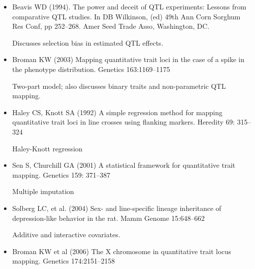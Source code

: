 \documentclass[12pt]{article}
\begin{document}
\hspace*{0.5in}
\begin{minipage}{9.5in}
\begin{itemize}
\itemsep8pt
\item Beavis WD (1994). The power and deceit of QTL experiments:
  Lessons from comparative QTL studies. In DB Wilkinson,
  (ed) 49th Ann Corn Sorghum Res Conf, pp
  252--268. Amer Seed Trade Asso, Washington, DC.

{\color{myblue} Discusses selection bias in estimated QTL effects.}

\item Broman KW (2003) Mapping quantitative trait loci in the case of
  a spike in the phenotype distribution. Genetics 163:1169--1175

{\color{myblue} Two-part model; also discusses binary traits and
  non-parametric QTL mapping.}

\item Haley CS, Knott SA (1992) A simple regression method for mapping
  quantitative trait loci in line crosses using flanking
  markers. Heredity 69: 315--324

{\color{myblue} Haley-Knott regression}

\item Sen S, Churchill GA (2001) A statistical framework for
  quantitative trait mapping. Genetics 159: 371--387

{\color{myblue} Multiple imputation}

\item Solberg LC, et al. (2004) Sex- and line-specific lineage
  inheritance of depression-like behavior in the rat. Mamm Genome
  15:648--662

{\color{myblue} Additive and interactive covariates.}

\item Broman KW et al (2006) The X chromosome in quantitative trait
  locus mapping. Genetics 174:2151--2158

\end{itemize}
\end{minipage}
\end{document}
